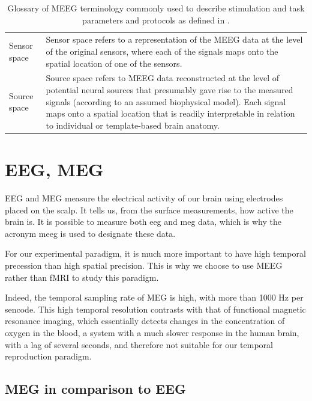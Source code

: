 \begin{table}[ht]
\begin{tabular}{@{}| p{3cm}|p{10cm}| @{}}
        Sensor space & Sensor space refers to a representation of the MEEG data at the level of the original sensors, where each of the signals maps onto the spatial location of one of the sensors.                                                                                                                                           \\
        Source space & Source space refers to MEEG data reconstructed at the level of potential neural sources that presumably gave rise to the measured signals (according to an assumed biophysical model). Each signal maps onto a spatial location that is readily interpretable in relation to individual or template-based brain anatomy. \\
        \hline
    \end{tabular}
    \caption[Glossary of MEEG terminology commonly used to describe stimulation and task parameters and protocol.]%
    {Glossary of MEEG terminology commonly used to describe stimulation and task parameters and protocols as defined in \cite{pernet2018best}.}

    \label{Tab:Glossary_protocol}
\end{table}



\section{EEG, MEG}

EEG and MEG measure the electrical activity of our brain using electrodes placed on the scalp. It tells us, from the surface measurements, how active the brain is. It is possible to measure both eeg and meg data, which is why the acronym meeg is used to designate these data.

For our experimental paradigm, it is much more important to have high temporal precession than high spatial precision. This is why we choose to use MEEG rather than fMRI to study this paradigm.

Indeed, the temporal sampling rate of MEG is high, with more than 1000 Hz per sencode. This high temporal resolution contrasts with that of functional magnetic resonance imaging, which essentially detects changes in the concentration of oxygen in the blood, a system with a much slower response in the human brain, with a lag of several seconds, and therefore not suitable for our temporal reproduction paradigm.


\subsection{MEG in comparison to EEG}

